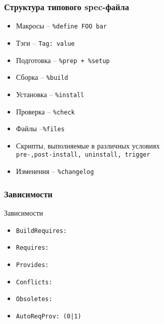 \begin{frame}
	\frametitle{Структура типового spec-файла}

	\begin{itemize}
		\item Макросы -- {\tt \%define FOO bar}
		\item Тэги -- {\tt Tag: value}
		\item Подготовка -- {\tt \%prep + \%setup} 
		\item Сборка -- {\tt \%build} 
		\item Установка -- {\tt \%install}
		\item Проверка -- {\tt \%check}
		\item Файлы --{\tt \%files}
		\item Скрипты, выполняемые в различных условиях\\
			{\tt pre-,post-install, uninstall, trigger}
		\item Изменения -- {\tt \%changelog }
	\end{itemize}

\end{frame}

\begin{frame}
	\frametitle{Зависимости}

	\begin{block}{Зависимости}
		\begin{itemize}
			\item {\tt BuildRequires:}
			\item {\tt Requires:}
			\item {\tt Provides:}
			\item {\tt Conflicts:}
			\item {\tt Obsoletes:}
			\item {\tt AutoReqProv: (0|1)}
		\end{itemize}
	\end{block}

\end{frame}

